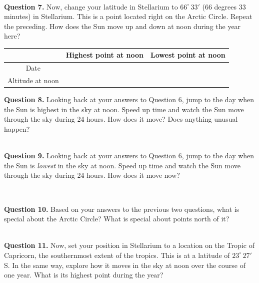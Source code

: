 \documentclass[11pt]{article}
\begin{document}
\vspace*{1.5cm}
\hrulefill\\
\textbf{Question 7.} 
Now, change your latitude in Stellarium to $66^\circ\,33'$ (66 degrees 33 minutes) in Stellarium. This is a point located right on the Arctic Circle. Repeat the preceding. How does the 
Sun move up and down at noon during the year here?
\renewcommand{\arraystretch}{2}
\vspace{1cm}
\begin{center}
\begin{tabular}{|c| c |c|}
\hline 
& Highest point at noon & Lowest point at noon \\
\hline
Date & & \\
\hline
Altitude at noon & & \\
\hline
\end{tabular}
\normalsize
\end{center}
\textbf{Question 8.} 
Looking back at your answers to Question 6, jump to the day when the Sun is highest in the sky at noon. Speed up time and watch
the Sun move through the sky during 24 hours. How does it move? Does anything unusual happen?


\vspace*{1.5cm}
\hrulefill\\


\textbf{Question 9.} 
Looking back at your answers to Question 6, jump to the day when the Sun is {\it lowest} in the sky at noon. Speed up time and watch
the Sun move through the sky during 24 hours. How does it move now?


\vspace*{1.5cm}
\hrulefill\\
\newpage

\textbf{Question 10.} 
Based on your answers to the previous two questions, what is special about the Arctic Circle? What is special about points north
of it?

\vspace*{1.5cm}
\hrulefill\\

\textbf{Question 11.} 
Now, set your position in Stellarium to a location on the Tropic of Capricorn, the southernmost extent of the tropics.
This is at a latitude of $23^\circ\,27'$ S. In the same way, explore how it moves in the sky at noon over the course of one
year. What is its highest point during the year?

\vspace*{1.5cm}
\hrulefill\\
\end{document}
